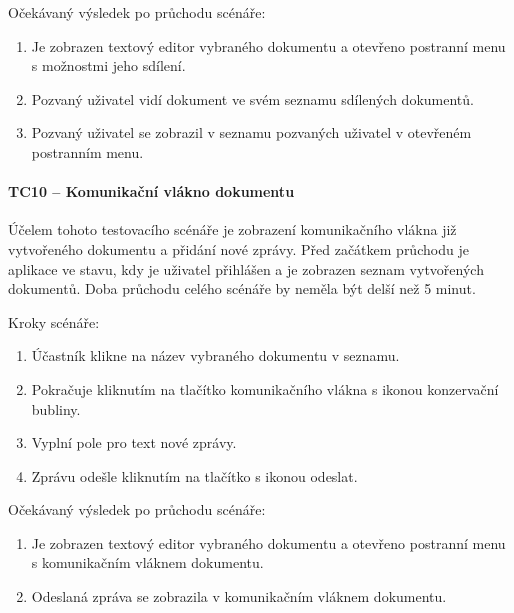 Očekávaný výsledek po průchodu scénáře:
\begin{enumerate}
    \item Je zobrazen textový editor vybraného dokumentu a otevřeno postranní menu s možnostmi jeho sdílení.
    \item Pozvaný uživatel vidí dokument ve svém seznamu sdílených dokumentů.
    \item Pozvaný uživatel se zobrazil v seznamu pozvaných uživatel v otevřeném postranním menu.
\end{enumerate}

\paragraph{TC10 -- Komunikační vlákno dokumentu}

Účelem tohoto testovacího scénáře je zobrazení komunikačního vlákna již vytvořeného dokumentu a přidání nové zprávy.
Před začátkem průchodu je aplikace ve stavu, kdy je uživatel přihlášen a je zobrazen seznam vytvořených dokumentů.
Doba průchodu celého scénáře by neměla být delší než 5 minut.

Kroky scénáře:
\begin{enumerate}
    \item Účastník klikne na název vybraného dokumentu v seznamu.
    \item Pokračuje kliknutím na tlačítko komunikačního vlákna s ikonou konzervační bubliny.
    \item Vyplní pole pro text nové zprávy.
    \item Zprávu odešle kliknutím na tlačítko s ikonou odeslat.
\end{enumerate}

Očekávaný výsledek po průchodu scénáře:
\begin{enumerate}
    \item Je zobrazen textový editor vybraného dokumentu a otevřeno postranní menu s komunikačním vláknem dokumentu.
    \item Odeslaná zpráva se zobrazila v komunikačním vláknem dokumentu.
\end{enumerate}
